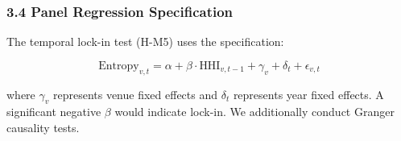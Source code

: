 \subsubsection{3.4 Panel Regression Specification}

The temporal lock-in test (H-M5) uses the specification:

$$\text{Entropy}_{v,t} = \alpha + \beta \cdot \text{HHI}_{v,t-1} + \gamma_v + \delta_t + \epsilon_{v,t}$$

where $\gamma _v$ represents venue fixed effects and $\delta _t$ represents year fixed effects. A significant negative $\beta$ would indicate lock-in. We additionally conduct Granger causality tests.

